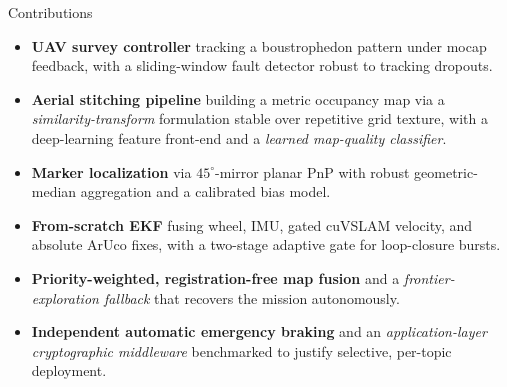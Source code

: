 \documentclass[aspectratio=169,11pt]{beamer}
\begin{document}
\begin{frame}{Contributions}
\small
\begin{itemize}
  \item \textbf{UAV survey controller} tracking a boustrophedon pattern under
        mocap feedback, with a sliding-window fault detector robust to tracking dropouts.
  \item \textbf{Aerial stitching pipeline} building a metric occupancy map via a
        \emph{similarity-transform} formulation stable over repetitive grid texture,
        with a deep-learning feature front-end and a \emph{learned map-quality classifier}.
  \item \textbf{Marker localization} via $45^\circ$-mirror planar PnP with robust
        geometric-median aggregation and a calibrated bias model.
  \item \textbf{From-scratch EKF} fusing wheel, IMU, gated cuVSLAM velocity, and
        absolute ArUco fixes, with a two-stage adaptive gate for loop-closure bursts.
  \item \textbf{Priority-weighted, registration-free map fusion} and a
        \emph{frontier-exploration fallback} that recovers the mission autonomously.
  \item \textbf{Independent automatic emergency braking} and an
        \emph{application-layer cryptographic middleware} benchmarked to justify
        selective, per-topic deployment.
\end{itemize}
\end{frame}
\end{document}
